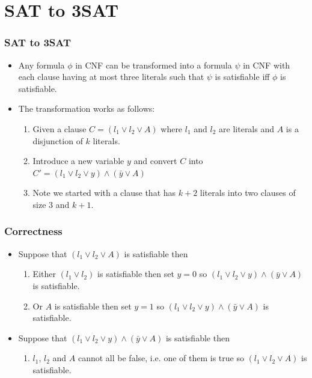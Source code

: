 \documentclass{beamer}
\begin{document}
\section{SAT to 3SAT}

\begin{frame}
  \frametitle{SAT to 3SAT}
  \begin{itemize}
  \item Any formula $\phi$ in CNF  can be transformed into a formula $\psi$ in CNF with each clause having at most three literals such that $\psi$ is satisfiable iff $\phi$ is satisfiable. 
\item The transformation works as follows:
  \begin{enumerate}
  \item Given a clause $C=(l_1\vee l_2\vee A)$ where $l_1$ and $l_2$ are literals and $A$ is a disjunction of $k$ literals.
  \item Introduce a new variable $y$ and convert $C$ into $C'=(l_1\vee l_2\vee y)\wedge (\bar{y}\vee A)$
  \item Note we started with a clause that has $k+2$ literals into two clauses of size $3$ and $k+1$.
   \end{enumerate}
  \end{itemize}
\end{frame}

\begin{frame}
  \frametitle{Correctness}
  \begin{itemize}
  \item Suppose that $(l_1\vee l_2\vee A)$ is satisfiable then
    \begin{enumerate}
    \item Either $(l_1\vee l_2)$ is satisfiable then set $y=0$ so $(l_1\vee l_2\vee y)\wedge(\bar{y}\vee A)$ is satisfiable.
    \item Or $A$ is satisfiable then set $y=1$ so $(l_1\vee l_2\vee y)\wedge(\bar{y}\vee A)$ is satisfiable.
    \end{enumerate}
  \item Suppose that $(l_1\vee l_2\vee y)\wedge (\bar{y}\vee A)$ is satisfiable then
    \begin{enumerate}
    \item $l_1$, $l_2$ and $A$ cannot all be false, i.e. one of them is true so $(l_1\vee l_2\vee A)$ is satisfiable.
    \end{enumerate}
  \end{itemize}
\end{frame}
\end{document}
